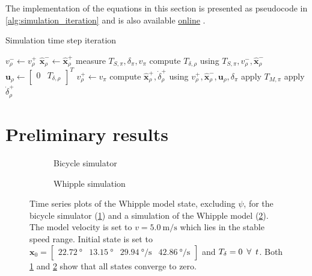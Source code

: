 \documentclass{icsc2017a}
\newcommand{\state}{\bm{x}}
\newcommand{\sysInput}{\bm{u}}
\newcommand{\stateEst}{\hat{\bm{x}}}
\newcommand{\yaw}{\psi}
\newcommand{\steer}{\delta}
\newcommand{\steerRate}{\dot{\delta}}
\newcommand{\pre}{-}
\newcommand{\post}{+}
\newcommand{\virtual}{\rho}
\newcommand{\physical}{\pi}
\begin{document}
The implementation of the equations in this section is presented as pseudocode in \autoref{alg:simulation_iteration}
and is also available \href{%
https://github.com/oliverlee/phobos%
}{online} \cite{lee2017}.\\
\begin{algorithm}[H]
\caption{Simulation time step iteration}
\label{alg:simulation_iteration}
\begin{algorithmic}[1]
    \State $v^\pre_\virtual \leftarrow v^\post_\virtual$
    \State $\stateEst^\pre_\virtual \leftarrow \stateEst^\post_\virtual$
    \State measure $T_{S,\physical}, \steer_\physical, v_\physical$
    \State compute $T_{\steer,\virtual}$ using $T_{S,\physical}, v^\pre_\virtual, \stateEst^\pre_\virtual$
    \State $\sysInput_\virtual \leftarrow \begin{bmatrix} 0 & T_{\steer,\virtual}\end{bmatrix}^T$
    \State $v^\post_\virtual \leftarrow v_{\physical}$
    \State compute $\stateEst^\post_\virtual, \steerRate^\post_\virtual$ using $v^\post_\virtual, \stateEst^\pre_\virtual, \sysInput_\virtual, \steer_\physical$
    \State apply $ T_{M,\physical} $
    \State apply $\steerRate^\post_\virtual$
\end{algorithmic}
\end{algorithm}

\section{Preliminary results}

\begin{figure}
\centering
\begin{subfigure}{0.45\textwidth}
    \centering
    \captionsetup{width=\linewidth}
    
    \caption{Bicycle simulator}
    \label{fig:state_ph}
\end{subfigure}
\hfill
\begin{subfigure}{0.45\textwidth}
    \centering
    \captionsetup{width=\linewidth}
    
    \caption{Whipple simulation}
    \label{fig:state_py}
\end{subfigure}
\caption[alt-caption]{Time series plots of the Whipple model state, excluding $\yaw$, for the bicycle simulator
    (\ref{fig:state_ph}) and a simulation of the Whipple model (\ref{fig:state_py}).
    The model velocity is set to $v = \SI{5.0}{\meter\per\second}$ which lies in the stable speed range.
    Initial state is set to $\state_0 = \begin{bmatrix}
        \SI{22.72}{\degree} & \SI{13.15}{\degree} & \SI{29.94}{\degree\per\second} & \SI{42.86}{\degree\per\second}
    \end{bmatrix}$ and $T_{\steer} = 0
    \enskip \forall \enskip t$.
    Both \ref{fig:state_ph} and \ref{fig:state_py} show that all states converge to zero.}
\label{fig:test}
\end{figure}
\end{document}
